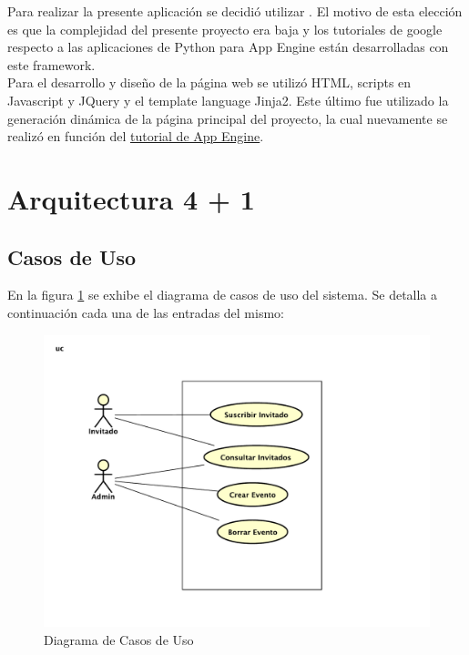 \documentclass[a4paper,10pt]{article}
\begin{document}
        Para realizar la presente aplicación se decidió utilizar . El motivo de esta elección es que
        la complejidad del presente proyecto era baja y los tutoriales de google respecto a las aplicaciones de 
        Python para App Engine están desarrolladas con este framework. \\
        \indent Para el desarrollo y diseño de la página web se utilizó HTML, scripts en Javascript y JQuery 
        y el template language Jinja2. Este último fue utilizado la generación dinámica de la página principal del 
        proyecto, la cual nuevamente se realizó en función del 
        \href{https://cloud.google.com/appengine/docs/python/gettingstartedpython27/introduction}{tutorial de App Engine}.
        

    \newpage
    \section{Arquitectura 4 + 1}
    \subsection{Casos de Uso}
        En la figura \ref{DiagCU} se exhibe el diagrama de casos de uso del sistema. Se detalla a continuación cada
        una de las entradas del mismo:

        \begin{figure}[!Hhtb]                                             
            \centering                                                   
            \includegraphics[width=15cm,origin=c]{Imagenes/Casos_De_Uso.pdf}        
            \caption{Diagrama de Casos de Uso} \label{DiagCU}
        \end{figure}
\end{document}
